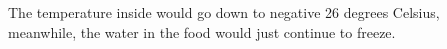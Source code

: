 The temperature inside would go down to negative 26 degrees Celsius, meanwhile, the water in the food would just continue to freeze.